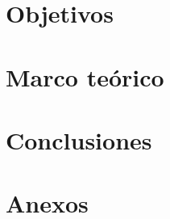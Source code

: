 \documentclass[letterpaper, oneside, openright, 12pt]{book}
\begin{document}
  \chapter{Objetivos}
  
  \newpage %

  \chapter{Marco teórico}
  
  \newpage %

  \chapter{Conclusiones}
  
  \newpage %

  \cleardoublepage
  \nocite{*} %
  \printbibliography

  \setcounter{section}{0} %
  \renewcommand{\thesection}{Anexo \arabic{section}}
  \chapter*{Anexos}
  
\end{document}

